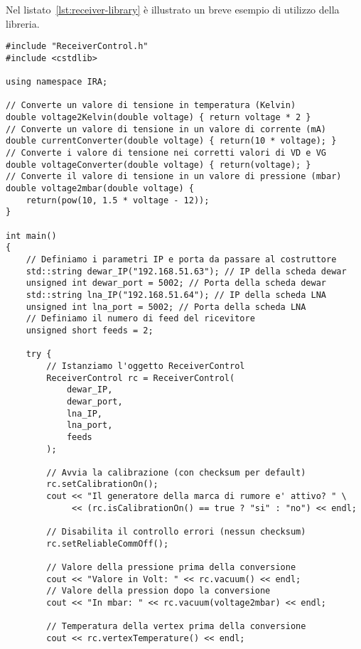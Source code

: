 Nel listato~\ref{lst:receiver-library} \`e illustrato un breve esempio di utilizzo della
libreria.
\lstset{language=C++}
\begin{lstlisting}[caption={[Esempio di utilizzo della libreria \texttt{ReceiverLibrary}]Esempio 
di utilizzo della libreria \texttt{ReceiverLibrary}},
label=lst:receiver-library,mathescape]
#include "ReceiverControl.h"
#include <cstdlib>

using namespace IRA;

// Converte un valore di tensione in temperatura (Kelvin)
double voltage2Kelvin(double voltage) { return voltage * 2 }
// Converte un valore di tensione in un valore di corrente (mA)
double currentConverter(double voltage) { return(10 * voltage); }
// Converte i valore di tensione nei corretti valori di VD e VG
double voltageConverter(double voltage) { return(voltage); }
// Converte il valore di tensione in un valore di pressione (mbar)
double voltage2mbar(double voltage) { 
    return(pow(10, 1.5 * voltage - 12)); 
}

int main()
{
    // Definiamo i parametri IP e porta da passare al costruttore
    std::string dewar_IP("192.168.51.63"); // IP della scheda dewar
    unsigned int dewar_port = 5002; // Porta della scheda dewar
    std::string lna_IP("192.168.51.64"); // IP della scheda LNA
    unsigned int lna_port = 5002; // Porta della scheda LNA
    // Definiamo il numero di feed del ricevitore
    unsigned short feeds = 2; 

    try {
        // Istanziamo l'oggetto ReceiverControl
        ReceiverControl rc = ReceiverControl(
            dewar_IP, 
            dewar_port, 
            lna_IP, 
            lna_port, 
            feeds
        );
    
        // Avvia la calibrazione (con checksum per default)
        rc.setCalibrationOn();
        cout << "Il generatore della marca di rumore e' attivo? " \
             << (rc.isCalibrationOn() == true ? "si" : "no") << endl;

        // Disabilita il controllo errori (nessun checksum)
        rc.setReliableCommOff();

        // Valore della pressione prima della conversione
        cout << "Valore in Volt: " << rc.vacuum() << endl;
        // Valore della pression dopo la conversione
        cout << "In mbar: " << rc.vacuum(voltage2mbar) << endl;

        // Temperatura della vertex prima della conversione
        cout << rc.vertexTemperature() << endl;


\end{lstlisting}
